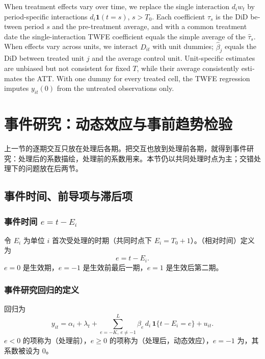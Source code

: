 \begin{english}
When treatment effects vary over time, we replace the single interaction $d_iw_t$ by period-specific interactions $d_i\mathbf{1}(t=s)$, $s>T_0$. Each coefficient $\tau_s$ is the DiD between period $s$ and the pre-treatment average, and with a common treatment date the single-interaction TWFE coefficient equals the simple average of the $\hat\tau_s$. When effects vary across units, we interact $D_{it}$ with unit dummies; $\hat\beta_j$ equals the DiD between treated unit $j$ and the average control unit. Unit-specific estimates are unbiased but not consistent for fixed $T$, while their average consistently estimates the ATT. With one dummy for every treated cell, the TWFE regression imputes $y_{it}(0)$ from the untreated observations only.
\end{english}

\section{事件研究：动态效应与事前趋势检验}\label{sec:U15b-es}

上一节的逐期交互只放在处理后各期。把交互也放到处理前各期，就得到事件研究：处理后的系数描绘，处理前的系数用来。本节仍以共同处理时点为主；交错处理下的问题放在后两节。

\subsection{事件时间、前导项与滞后项}

\subsubsection{事件时间 \texorpdfstring{$e=t-E_i$}{e = t - E\_i}}

令 $E_i$ 为单位 $i$ 首次受处理的时期（共同时点下 $E_i=T_0+1$）。（相对时间）定义为
\[
e=t-E_i .
\]
$e=0$ 是生效期，$e=-1$ 是生效前最后一期，$e=1$ 是生效后第二期。

\subsubsection{事件研究回归的定义}

\begin{defn}[事件研究回归]\label{def:U15b-es}
回归为
\[
y_{it}=\alpha_i+\lambda_t+\sum_{e=-K,\ e\neq-1}^{L}\beta_e\,d_i\,\mathbf{1}\{t-E_i=e\}+u_{it}.
\]
$e<0$ 的项称为（处理前），$e\ge0$ 的项称为（处理后，动态效应），$e=-1$ 为，其系数被设为 0。
\end{defn}

